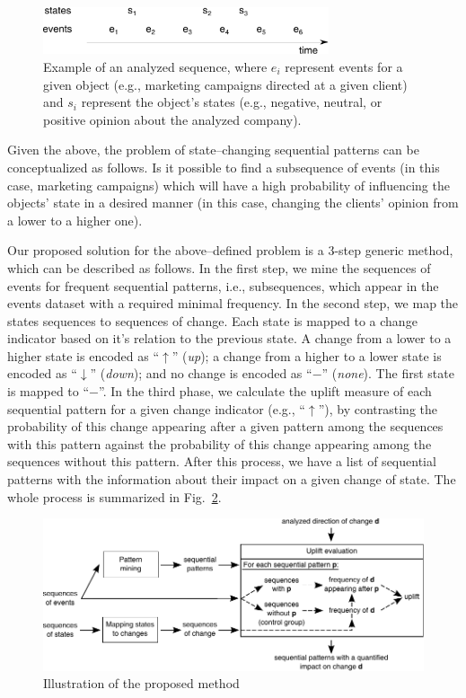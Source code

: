 \documentclass[runningheads,a4paper]{llncs}
\begin{document}
\begin{figure}[!ht]
	\centering
		\includegraphics[width=0.75\textwidth]{images/example}
	\caption{Example of an analyzed sequence, where $e_i$ represent events for a given object (e.g., marketing campaigns directed at a given client) and $s_i$ represent the object's states (e.g., negative, neutral, or positive opinion about the analyzed company).}
	\label{fig:example}
\end{figure}

Given the above, the problem of state--changing sequential patterns can be conceptualized as follows.
Is it possible to find a subsequence of events (in this case, marketing campaigns) which will have a high probability of influencing the objects' state in a desired manner (in this case, changing the clients' opinion from a lower to a higher one).

Our proposed solution for the above--defined problem is a 3-step generic method, which can be described as follows.
In the first step, we mine the sequences of events for frequent sequential patterns, i.e., subsequences, which appear in the events dataset with a required minimal frequency.
In the second step, we map the states sequences to sequences of change.
Each state is mapped to a change indicator based on it's relation to the previous state.
A change from a lower to a higher state is encoded as ``$\uparrow$'' (\textit{up}); a change from a higher to a lower state is encoded as ``$\downarrow$'' (\textit{down}); and no change is encoded as ``$-$'' (\textit{none}).
The first state is mapped to ``$-$''.
In the third phase, we calculate the uplift measure of each sequential pattern for a given change indicator (e.g., ``$\uparrow$''), by contrasting the probability of this change appearing after a given pattern among the sequences with this pattern against the probability of this change appearing among the sequences without this pattern.
After this process, we have a list of sequential patterns with the information about their impact on a given change of state.
The whole process is summarized in Fig.~\ref{fig:concept}.

\begin{figure}[!ht]
	\centering
		\includegraphics[width=\textwidth]{images/concept}
	\caption{Illustration of the proposed method}
	\label{fig:concept}
\end{figure}
\end{document}
